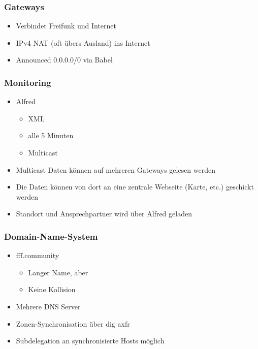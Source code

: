 \begin{frame}
\frametitle{Gateways}
    \begin{itemize}
        \item Verbindet Freifunk und Internet
        \item IPv4 NAT (oft übers Ausland) ins Internet
        \item Announced 0.0.0.0/0 via Babel
    \end{itemize}
\end{frame}



\begin{frame}
\frametitle{Monitoring}
    \begin{itemize}
        \item Alfred
        \begin{itemize}
            \item XML
            \item alle 5 Minuten
            \item Multicast
        \end{itemize}
        \item Multicast Daten können auf mehreren Gateways gelesen werden
        \item Die Daten können von dort an eine zentrale Webseite (Karte, etc.) geschickt werden
        \item Standort und Ansprechpartner wird über Alfred geladen
    \end{itemize}
\end{frame}

\begin{frame}
\frametitle{Domain-Name-System}
    \begin{itemize}
        \item fff.community
        \begin{itemize}
            \item Langer Name, aber
            \item Keine Kollision
        \end{itemize}
        \item Mehrere DNS Server
        \item Zonen-Synchronisation über dig axfr
        \item Subdelegation an synchronisierte Hosts möglich
    \end{itemize}
\end{frame}

